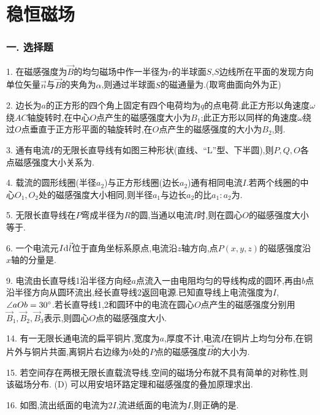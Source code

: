 \section*{稳恒磁场}

\subsubsection*{一. 选择题}

1. 在磁感强度为$\vec B$的均匀磁场中作一半径为$r$的半球面$S$,$S$边线所在平面的发现方向单位矢量$\vec n$与$\vec B$的夹角为$\alpha$,则通过半球面$S$的磁通量为.(取弯曲面向外为正)

2. 边长为$a$的正方形的四个角上固定有四个电荷均为$q$的点电荷.此正方形以角速度$\omega$绕$AC$轴旋转时,在中心$O$点产生的磁感强度大小为$B_1$;此正方形以同样的角速度$\omega$绕过$O$点垂直于正方形平面的轴旋转时,在$O$点产生的磁感强度的大小为$B_2$,则.

3. 通有电流$I$的无限长直导线有如图三种形状(直线、“L”型、下半圆),则$P,Q,O$各点磁感强度大小关系为.

4. 载流的圆形线圈(半径$a_2$)与正方形线圈(边长$a_2$)通有相同电流$I$.若两个线圈的中心$O_1,O_2$处的磁感强度大小相同,则半径$a_1$与边长$a_2$的比$a_1:a_2$为.

5. 无限长直导线在$P$弯成半径为$R$的圆,当通以电流$I$时,则在圆心$O$的磁感强度大小等于.

6. 一个电流元$I{\mathrm{d}\:\!}\vec l$位于直角坐标系原点,电流沿$z$轴方向,点$P(x,y,z)$的磁感强度沿$x$轴的分量是.

9. 电流由长直导线1沿半径方向经$a$点流入一由电阻均匀的导线构成的圆环,再由$b$点沿半径方向从圆环流出,经长直导线2返回电源.已知直导线上电流强度为$I$,$\angle aOb=30\degree$.若长直导线1,2和圆环中的电流在圆心$O$点产生的磁感强度分别用$\vec B_1,\vec B_2,\vec B_3$表示,则圆心$O$点的磁感强度大小.

14. 有一无限长通电流的扁平铜片,宽度为$a$,厚度不计,电流$I$在铜片上均匀分布,在铜片外与铜片共面,离铜片右边缘为$b$处的$P$点的磁感强度$\vec B$的大小为.

15. 若空间存在两根无限长直载流导线,空间的磁场分布就不具有简单的对称性,则该磁场分布.\pp
    (D) 可以用安培环路定理和磁感强度的叠加原理求出.

16. 如图,流出纸面的电流为$2I$,流进纸面的电流为$I$,则正确的是.

